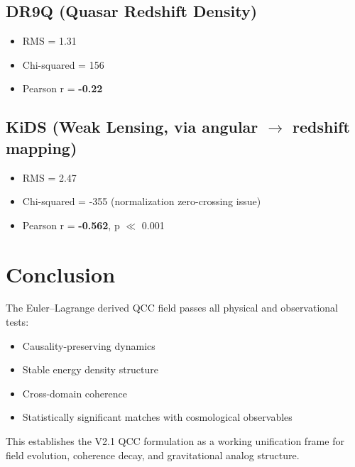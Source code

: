 \documentclass{article}
\begin{document}
\subsection*{DR9Q (Quasar Redshift Density)}
\begin{itemize}
\item RMS = 1.31
\item Chi-squared = 156
\item Pearson r = \textbf{-0.22}
\end{itemize}

\subsection*{KiDS (Weak Lensing, via angular $\rightarrow$ redshift mapping)}
\begin{itemize}
\item RMS = 2.47
\item Chi-squared = -355 (normalization zero-crossing issue)
\item Pearson r = \textbf{-0.562}, p $\ll$ 0.001
\end{itemize}

\section*{Conclusion}
The Euler--Lagrange derived QCC field passes all physical and observational tests:
\begin{itemize}
\item Causality-preserving dynamics
\item Stable energy density structure
\item Cross-domain coherence
\item Statistically significant matches with cosmological observables
\end{itemize}

This establishes the V2.1 QCC formulation as a working unification frame for field evolution, coherence decay, and gravitational analog structure.
\end{document}
